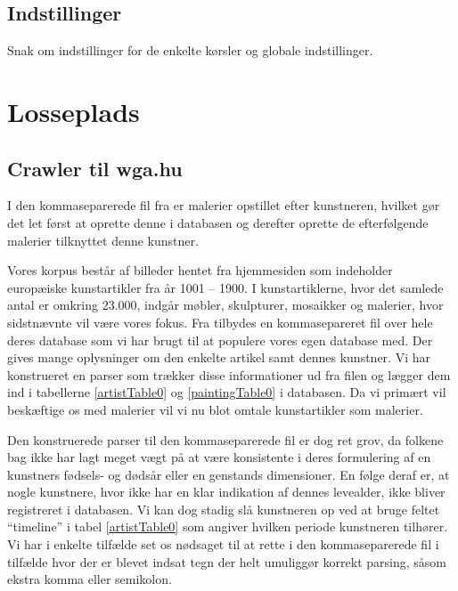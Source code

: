 {\subsection{Indstillinger}
Snak om indstillinger for de enkelte kørsler og globale indstillinger.


\section{Losseplads}

\subsection{Crawler til wga.hu}
I den kommaseparerede fil fra \cite{wgahu} er
malerier opstillet efter kunstneren, hvilket gør det let først at
oprette denne i databasen og derefter oprette de efterfølgende malerier
tilknyttet denne kunstner.

Vores korpus består af billeder hentet fra hjemmesiden \cite{wgahu} som
indeholder europæiske kunstartikler fra år 1001 -- 1900. I
kunstartiklerne, hvor det samlede antal er omkring 23.000, indgår
møbler, skulpturer, mosaikker og malerier, hvor sidstnævnte vil være
vores fokus. Fra \cite{wgahu} tilbydes en kommasepareret fil over hele
deres database som vi har brugt til at populere vores egen database med.
Der gives mange oplysninger om den enkelte artikel samt dennes kunstner.
Vi har konstrueret en parser som trækker disse informationer ud fra
filen og lægger dem ind i tabellerne \ref{artistTable0} og
\ref{paintingTable0} i databasen. Da vi primært vil beskæftige os med
malerier vil vi nu blot omtale kunstartikler som malerier.

Den konstruerede parser til den kommaseparerede fil er dog ret grov, da
folkene bag \cite{wgahu} ikke har lagt meget vægt på at være konsistente
i deres formulering af en kunstners fødsels- og dødsår eller en
genstands dimensioner. En følge deraf er, at nogle kunstnere, hvor
\cite{wgahu} ikke har en klar indikation af dennes levealder, ikke bliver
registreret i databasen. Vi kan dog stadig slå kunstneren op ved at
bruge feltet ``timeline'' i tabel \ref{artistTable0} som angiver hvilken
periode kunstneren tilhører. Vi har i enkelte tilfælde set os nødsaget
til at rette i den kommaseparerede fil i tilfælde hvor der er blevet
indsat tegn der helt umuliggør korrekt parsing, såsom ekstra komma
eller semikolon.

}
